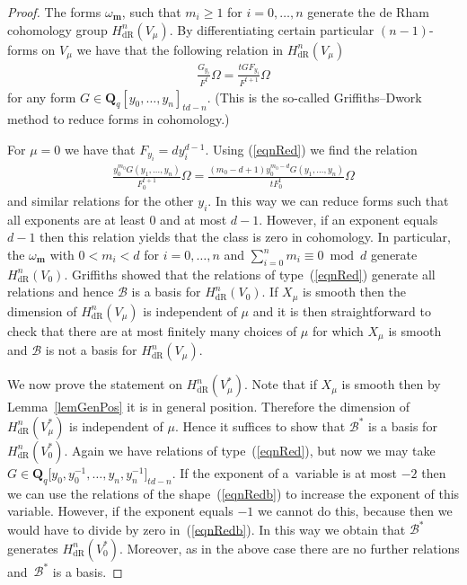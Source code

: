 \documentclass[11pt]{article}
\numberwithin{equation}{section}
\DeclareMathOperator{\dR}{dR}
\begin{document}
\begin{proof} The forms $\omega_{\mathbf{m}}$, such that $m_i \geq 1$ for $i=0,\dots,n$ generate the de Rham cohomology group $H^n_{\dR}(V_\mu)$.
By dif\/ferentiating certain particular $(n-1)$-forms on $V_\mu$ we have that the following relation in $H^n_{\dR}(V_\mu)$
\begin{gather}\label{eqnRed} \frac{G_{y_i}}{F^t} \Omega = \frac{t G F_{y_i}}{F^{t+1}} \Omega \end{gather}
for any form $G\in \mathbf{Q}_q[y_0,\dots,y_n]_{td-n}$. (This is the so-called Grif\/f\/iths--Dwork method to reduce forms in cohomology.)

For $\mu=0$ we have that $F_{y_i}=dy_i^{d-1}$. Using (\ref{eqnRed}) we f\/ind the relation \begin{gather} \label{eqnRedb} \frac{y_0^{m_0} G(y_1,\dots,y_n)}{F_0^{t+1}}\Omega = \frac{(m_0-d+1)y_0^{m_0-d} G(y_1,\dots,y_n)}{t F_0^t} \Omega\end{gather}
and similar relations for the other $y_i$. In this way we can reduce forms such that all exponents are at least $0$ and at most $d-1$. However, if an exponent equals $d-1$ then this relation yields that the class is zero in cohomology. In particular, the $\omega_{\mathbf{m}}$ with $0<m_i<d$ for $i=0,\dots, n$ and $\sum\limits_{i=0}^n m_i\equiv 0 \bmod d$ generate $H^n_{\dR}(V_0)$. Grif\/f\/iths \cite{GriRat} showed that the relations of type~(\ref{eqnRed}) generate all relations and hence $\mathcal{B}$ is a basis for $H^n_{\dR}(V_0)$. If $X_\mu$ is smooth then the dimension of $H^n_{\dR}(V_\mu)$ is independent of $\mu$ and it is then straightforward to check that there are at most f\/initely many choices of $\mu$ for which $X_\mu$ is smooth and $\mathcal{B}$ is not a basis for $H^n_{\dR}(V_\mu)$.

We now prove the statement on $H^n_{\dR}(V_\mu^*)$. Note that if $X_\mu$ is smooth then by Lemma~\ref{lemGenPos} it is in general position. Therefore the dimension of $H^n_{\dR}(V_\mu^*)$ is independent of $\mu$. Hence it suf\/f\/ices to show that $\mathcal{B}^*$ is a basis for $H^n_{\dR}(V_0^*)$. Again we have relations of type~(\ref{eqnRed}), but now we may take $G\in \mathbf{Q}_q\big[y_0,y_0^{-1},\dots,y_n,y_n^{-1}\big]_{td-n}$. If the exponent of a~variable is at most $-2$ then we can use the relations of the shape~(\ref{eqnRedb}) to increase the exponent of this variable. However, if the exponent equals $-1$ we cannot do this, because then we would have to divide by zero in~(\ref{eqnRedb}). In this way we obtain that $\mathcal{B}^*$ generates $H^n_{\dR}(V^*_0)$. Moreover, as in the above case there are no further relations and~$\mathcal{B}^*$ is a basis.
\end{proof}
\end{document}
